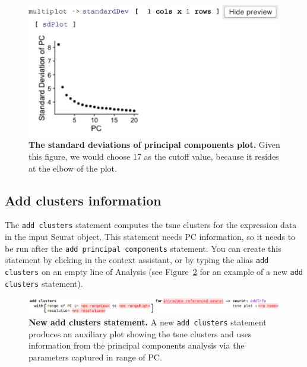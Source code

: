 \begin{figure}
  \centering
    \includegraphics[width=\figWidthNarrow]{figures/ElbowView.pdf}
    \caption[The standard deviations of principal components plot.]{\textbf{The standard deviations of
    principal components plot.} Given this figure, we would choose 17 as the cutoff value,
    because it resides at the elbow of the plot.}
\label{fig:ElbowView}
\end{figure}

\subsection{Add clusters information}
The \texttt{add clusters} statement computes the tsne clusters for the expression
data in the input Seurat object. This statement needs PC information, so it needs to be
run after the \texttt{add principal components} statement. You can create this statement by clicking
 in the context assistant, or by typing
the alias \texttt{add clusters} on an empty line of Analysis (see Figure~\ref{fig:AddClusters}
for an example of a new \texttt{add clusters} statement).

\begin{figure}[h!tbp]
  \centering
    \includegraphics[width=\figWidthWide]{figures/AddClusters.png}
    \caption[New add clusters statement.]{\textbf{New add clusters statement.} A new
    \texttt{add clusters} statement produces an auxiliary plot showing the tsne clusters
    and uses information from the principal components analysis via the parameters captured
    in range of PC.}
\label{fig:AddClusters}
\end{figure}

